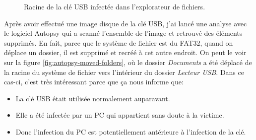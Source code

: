 \begin{figure}
    \centering
    \caption{Racine de la clé USB infectée dans l'explorateur de fichiers.}
    \label{fig:infected-usb-key}
\end{figure}

Après avoir effectué une image disque de la clé USB, j'ai lancé une analyse avec le logiciel Autopsy qui a scanné l'ensemble de l'image et retrouvé des éléments supprimés. En fait, parce que le système de fichier est du FAT32, quand on déplace un dossier, il est supprimé et recréé à cet autre endroit. On peut le voir sur la figure \ref{fig:autopsy-moved-folders}, où le dossier \textit{Documents} a été déplacé de la racine du système de fichier vers l'intérieur du dossier \textit{Lecteur USB}. Dans ce cas-ci, c'est très intéressant parce que ça nous informe que:
\begin{itemize}
    \item La clé USB était utilisée normalement auparavant.
    \item Elle a été infectée par un PC qui appartient sans doute à la victime.
    \item Donc l'infection du PC est potentiellement antérieure à l'infection de la clé.
\end{itemize}

